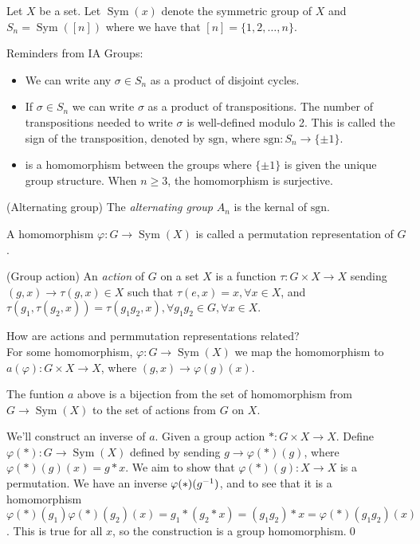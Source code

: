 \documentclass{article}
\DeclareMathOperator{\sym}{Sym}
\begin{document}
\begin{itemize}
\begin{definition}
	Let $ X $ be a set. Let $ \sym(x) $ denote the symmetric group of $ X $ and $ S_n=\sym([n]) $ where we have that $ [n]=\{1,2,\dots, n\} $.
\end{definition}
Reminders from IA Groups:
\begin{itemize}
	\item We can write any $ \sigma\in S_n $ as a product of disjoint cycles.
	\item If $ \sigma \in S_n $ we can write $ \sigma $ as a product of transpositions. The number of transpositions needed to write $ \sigma $ is well-defined modulo 2. This is called the sign of the transposition, denoted by $ \mathrm {sgn} $, where $ \mathrm{sgn}: S_n\to \{\pm 1\} $.
	\item {} is a homomorphism between the groups where $ \{\pm 1\} $ is given the unique group structure. When $ n\ge 3 $, the homomorphism is surjective.
\end{itemize}
\begin{definition}
	(Alternating group) The \textit{alternating group} $ A_n $ is the kernal of $ \mathrm{sgn} $.
\end{definition}
A homomorphism $ \varphi: G\to \sym(X) $ is called a permutation representation of $ G $.
\begin{definition}
	(Group action) An \textit{action} of $ G $ on a set $ X $ is a function $ \tau:G\times X\to X $ sending $ (g,x) \to \tau(g,x)\in X $ such that $ \tau(e,x)=x, \forall x\in X $, and $ \tau(g_1,\tau(g_2,x))=\tau(g_1g_2,x), \forall g_1g_2\in G, \forall x\in X $.
\end{definition}
How are actions and permmutation representations related?\\
For some homomorphism, $ \varphi: G\to\sym(X) $ we map the homomorphism to $ a(\varphi):G\times X\to X $, where $ (g,x)\to\varphi(g)(x) $.
\begin{proposition}
  The funtion $ a $ above is a bijection from the set of homomorphism from $ G\to\sym(X) $ to the set of actions from $ G $ on $ X $.
\end{proposition}
\pf We'll construct an inverse of $ a $. Given a group action $ *:G\times X \to X $. Define $ \varphi(*): G\to \sym(X) $ defined by sending $ g\to\varphi(*)(g) $, where $ \varphi(*)(g)(x)=g*x $. We aim to show that $ \varphi(*)(g):X\to X $ is a permutation. We have an inverse $ \varphi(*)({g}^{-1}) $, and to see that it is a homomorphism $ \varphi(*)(g_1)\varphi(*)(g_2)(x)=g_1*(g_2*x)=(g_1g_2)*x=\varphi(*)(g_1g_2)(x) $. This is true for all $ x $, so the construction is a group homomorphism.\qed\\

\end{itemize}
\end{document}
